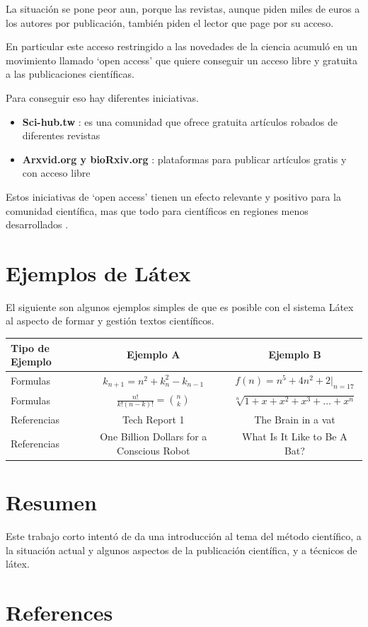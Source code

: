 \documentclass[article]{elsarticle}
\begin{document}
La situación se pone peor aun, porque las revistas, aunque piden miles de euros
a los autores por publicación, también piden el lector que page por su acceso.

En particular este acceso restringido a las novedades de la ciencia acumuló en
un movimiento llamado ‘open access’ que quiere conseguir un acceso libre y
gratuita a las publicaciones científicas.

Para conseguir eso hay diferentes iniciativas.
\begin{itemize}
\item \textbf{Sci-hub.tw} : es una comunidad que ofrece gratuita artículos robados de diferentes revistas
\item \textbf{Arxvid.org y bioRxiv.org} : plataformas para publicar artículos gratis y con acceso libre 
\end{itemize}

Estos iniciativas de ‘open access’ tienen un efecto relevante y positivo para
la comunidad científica, mas que todo para científicos en regiones menos
desarrollados \cite{Evans2009}. \par

\newpage
\section{Ejemplos de Látex}
El siguiente son algunos ejemplos simples de que es posible con el sistema Látex
al aspecto de formar y gestión textos científicos.

\vspace{1.5\baselineskip}

\begin{tabular}{l|c|c}
    Tipo de Ejemplo   & Ejemplo A & Ejemplo B  \\
    \hline
    \hline
    Formulas &\(k_{n+1} = n^2 + k_n^2 - k_{n-1}\)   & \( f(n) = n^5 + 4n^2 + 2 |_{n=17} \) \\
    Formulas & \( \frac{n!}{k!(n-k)!} = \binom{n}{k} \) & \( \sqrt[n]{1+x+x^2+x^3+\dots+x^n} \) \\
    Referencias & Tech Report 1\cite{Hughes2007} & The Brain in a vat \cite{Putnam1994} \\
    Referencias & One Billion Dollars for a Conscious Robot \cite{Bringsjord2007} & What Is It Like to Be A Bat? \cite{Nagel1974}\\
\end{tabular}

\vspace{1.5\baselineskip}

\section{Resumen}
Este trabajo corto intentó de da una introducción al tema del método científico,
a la situación actual y algunos aspectos de la publicación científica, y a técnicos de látex.

\section*{References}


\end{document}
